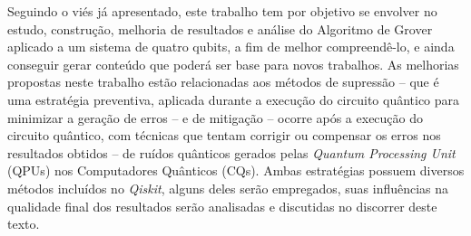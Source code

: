 Seguindo o vi\'{e}s j\'{a} apresentado, este trabalho tem por objetivo se envolver no estudo, construç\~{a}o, melhoria de resultados e an\'{a}lise do Algoritmo de Grover aplicado a um sistema de quatro qubits, a fim de melhor compreend\^{e}-lo, e ainda conseguir gerar conteúdo que poder\'{a} ser base para novos trabalhos. As melhorias propostas neste trabalho est\~{a}o relacionadas aos m\'{e}todos de supress\~{a}o – que \'{e} uma estrat\'{e}gia preventiva, aplicada durante a execuç\~{a}o do circuito qu\^{a}ntico para minimizar a geraç\~{a}o de erros – e de mitigaç\~{a}o – ocorre após a execuç\~{a}o do circuito qu\^{a}ntico, com t\'{e}cnicas que tentam corrigir ou compensar os erros nos resultados obtidos – de ruídos qu\^{a}nticos gerados pelas \textit{Quantum Processing Unit} (QPUs) nos Computadores Qu\^{a}nticos (CQs). Ambas estrat\'{e}gias possuem diversos m\'{e}todos incluídos no \emph{Qiskit}, alguns deles ser\~{a}o empregados, suas influ\^{e}ncias na qualidade final dos resultados ser\~{a}o analisadas e discutidas no discorrer deste texto.



